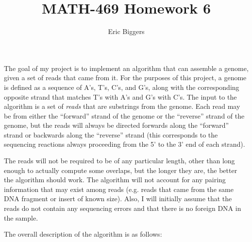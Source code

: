 \documentclass[letterpaper,12pt]{article}
\title{MATH-469 Homework 6}
\author{Eric Biggers}
\begin{document}
\maketitle

The goal of my project is to implement an algorithm that can assemble a genome,
given a set of reads that came from it.  For the purposes of this project, a
genome is defined as a sequence of A's, T's, C's, and G's, along with the
corresponding opposite strand that matches T's with A's and G's with C's.  The
input to the algorithm is a set of {\em reads} that are substrings from the
genome.  Each read may be from either the ``forward'' strand of the genome or
the ``reverse'' strand of the genome, but the reads will always be directed
forwards along the ``forward'' strand or backwards along the ``reverse'' strand
(this corresponds to the sequencing reactions always proceeding from the 5' to
the 3' end of each strand).

The reads will not be required to be of any particular length, other than long
enough to actually compute some overlaps, but the longer they are, the better
the algorithm should work.  The algorithm will not account for any pairing
information that may exist among reads (e.g. reads that came from the same DNA
fragment or insert of known size).  Also, I will initially assume that the reads
do not contain any sequencing errors and that there is no foreign DNA in the
sample.

The overall description of the algorithm is as follows:
\end{document}
